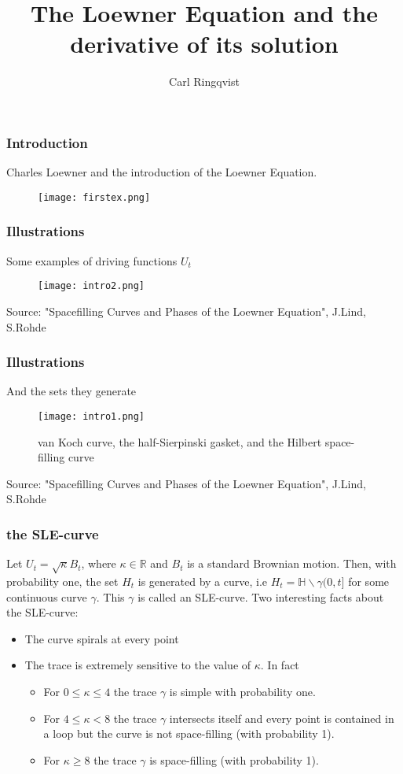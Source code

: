\documentclass[10pt, compress]{beamer}
\title{The Loewner Equation and the derivative of its solution}
\subtitle{}
\author{Carl Ringqvist} %
\institute{Master's Thesis presentation, KTH \& SU}
\begin{document}
\maketitle

\begin{frame}[fragile]
\frametitle{Introduction}
Charles Loewner and the introduction of the Loewner Equation.
\begin{figure}
  \centering
 \texttt{[image: firstex.png]}
\end{figure}

\end{frame}

\begin{frame}[fragile]
  \frametitle{Illustrations}
  Some examples of driving functions $U_{t}$ 
\begin{figure}
  \centering
 \texttt{[image: intro2.png]}
\end{figure}
\tiny
Source: "Spacefilling Curves and Phases of the Loewner Equation", J.Lind, S.Rohde
\normalsize
\end{frame}

\begin{frame}[fragile]
  \frametitle{Illustrations}
And the sets they generate
\begin{figure}
  \centering
 \texttt{[image: intro1.png]}
 \caption{van Koch curve, the half-Sierpinski gasket, and the Hilbert space-filling curve}
\end{figure}
\tiny
Source: "Spacefilling Curves and Phases of the Loewner Equation", J.Lind, S.Rohde
\normalsize
\end{frame}

\begin{frame}[fragile]
  \frametitle{the SLE-curve}
Let $U_{t}=\sqrt{\kappa}B_{t}$, where $\kappa \in \mathbb{R}$ and $B_{t}$ is a standard Brownian motion. Then, with probability one, the set $H_{t}$ is generated by a curve, i.e $H_{t}=\mathbb{H}\backslash \gamma(0,t]$ for some continuous curve $\gamma$. This $\gamma$ is called an SLE-curve. Two interesting facts about the SLE-curve:


\begin{itemize}
\item The curve spirals at every point
\item The trace is extremely sensitive to the value of $\kappa$. In fact 
\begin{itemize}
\item For $0 \leq \kappa \leq 4$ the trace $\gamma$ is simple with probability one.
\item For $4 \leq \kappa < 8$ the trace $\gamma$ intersects itself and every point is contained in a loop but the curve is not space-filling (with probability 1).
\item For $\kappa \geq 8$ the trace $\gamma$ is space-filling (with probability 1).
\end{itemize}
\end{itemize}

\end{frame}
\end{document}
